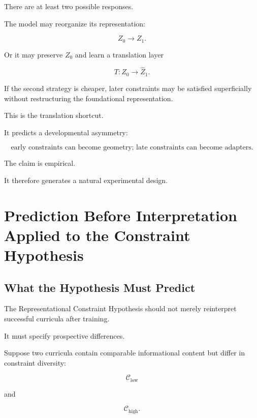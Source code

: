 \documentclass[11pt]{article}
\theoremstyle{remark}
\begin{document}
There are at least two possible responses.

The model may reorganize its representation:

\begin{equation}
Z_0
\longrightarrow
Z_1.
\end{equation}

Or it may preserve $Z_0$ and learn a translation layer

\begin{equation}
T:Z_0\rightarrow\hat{Z}_1.
\end{equation}

If the second strategy is cheaper, later constraints may be satisfied superficially without restructuring the foundational representation.

This is the translation shortcut.

It predicts a developmental asymmetry:

\begin{equation}
\boxed{
\text{early constraints can become geometry;
late constraints can become adapters}.
}
\end{equation}

The claim is empirical.

It therefore generates a natural experimental design.

\section{Prediction Before Interpretation Applied to the Constraint Hypothesis}

\subsection{What the Hypothesis Must Predict}

The Representational Constraint Hypothesis should not merely reinterpret successful curricula after training.

It must specify prospective differences.

Suppose two curricula contain comparable informational content but differ in constraint diversity:

\begin{equation}
\mathcal{C}_{\mathrm{low}}
\end{equation}

and

\begin{equation}
\mathcal{C}_{\mathrm{high}}.
\end{equation}
\end{document}
